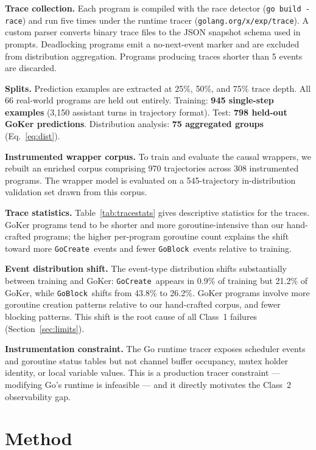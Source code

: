 \documentclass[10pt,conference]{IEEEtran}
\newcommand{\eblock}{\texttt{GoBlock}}
\newcommand{\ecreate}{\texttt{GoCreate}}
\begin{document}
\textbf{Trace collection.}
Each program is compiled with the race detector
(\texttt{go build -race}) and run five times under the runtime tracer
(\texttt{golang.org/x/exp/trace}).
A custom parser converts binary trace files to the JSON snapshot schema
used in prompts.
Deadlocking programs emit a no-next-event marker and are excluded from
distribution aggregation.
Programs producing traces shorter than 5 events are discarded.

\textbf{Splits.}
Prediction examples are extracted at 25\%, 50\%, and 75\% trace depth.
All 66 real-world programs are held out entirely.
Training: \textbf{945 single-step examples} (3,150 assistant turns in
trajectory format).
Test: \textbf{798 held-out GoKer predictions}.
Distribution analysis: \textbf{75 aggregated groups} (Eq.~\eqref{eq:dist}).

\textbf{Instrumented wrapper corpus.} To train and evaluate the causal wrappers, we rebuilt an enriched corpus comprising 970 trajectories across 308 instrumented programs. The wrapper model is evaluated on a 545-trajectory in-distribution validation set drawn from this corpus.

\textbf{Trace statistics.}
Table~\ref{tab:tracestats} gives descriptive statistics for the traces.
GoKer programs tend to be shorter and more goroutine-intensive than
our hand-crafted programs; the higher per-program goroutine count
explains the shift toward more \ecreate\ events and fewer \eblock\
events relative to training.

\textbf{Event distribution shift.}
The event-type distribution shifts substantially between training and
GoKer: \ecreate\ appears in 0.9\% of training but 21.2\% of GoKer,
while \eblock\ shifts from 43.8\% to 26.2\%.
GoKer programs involve more goroutine creation patterns relative to our
hand-crafted corpus, and fewer blocking patterns.
This shift is the root cause of all Class~1 failures
(Section~\ref{sec:limits}).

\textbf{Instrumentation constraint.}
The Go runtime tracer exposes scheduler events and goroutine status
tables but not channel buffer occupancy, mutex holder identity, or local
variable values.
This is a production tracer constraint — modifying Go's runtime is
infeasible — and it directly motivates the Class~2 observability gap.

\section{Method}\label{sec:method}
\end{document}
